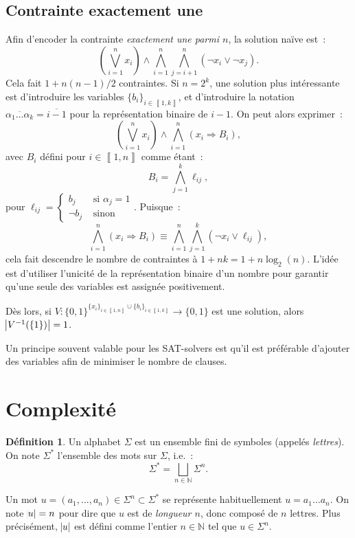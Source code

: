 \documentclass{article}
\theoremstyle{definition}
\newtheorem{déf}[thm]{Définition}
\theoremstyle{remark}
\newcommand{\intint}[2]{\left\llbracket#1, #2\right\rrbracket}
\newcommand{\N}{\mathbb N}
\begin{document}
	\subsection{Contrainte exactement une}
		Afin d'encoder la contrainte \textit{exactement une parmi $n$}, la solution naïve est~:
		\[\left(\bigvee_{i=1}^nx_i\right) \land \bigwedge_{i=1}^n\bigwedge_{j=i+1}^n(\lnot x_i \lor \lnot x_j).\]
		Cela fait $1+n(n-1)/2$ contraintes. Si $n=2^k$, une solution plus intéressante est d'introduire les variables $\{b_i\}_{i \in \intint 1k}$, et d'introduire
		la notation $\overline {\alpha_1\ldots\alpha_k} = \overline {i-1}$ pour la représentation binaire de $i-1$. On peut alors exprimer~:
		\[\left(\bigvee_{i=1}^nx_i\right) \land \bigwedge_{i=1}^n(x_i \Rightarrow B_i),\]
		avec $B_i$ défini pour $i \in \intint 1n$ comme étant~:
		\[B_i = \bigwedge_{j=1}^k\ell_{ij},\]
		pour $\ell_{ij} = \begin{cases}b_j &\text{ si }\alpha_j = 1 \\\lnot b_j&\text{ sinon}\end{cases}$. Puisque~:
		\[\bigwedge_{i=1}^n(x_i \Rightarrow B_i) \equiv \bigwedge_{i=1}^n\bigwedge_{j=1}^k(\lnot x_i \lor \ell_{ij}),\]
		cela fait descendre le nombre de contraintes à $1+nk = 1+n\log_2(n)$. L'idée est d'utiliser l'unicité de la représentation binaire d'un nombre pour garantir
		qu'une seule des variables est assignée positivement.

		Dès lors, si $V : \{0, 1\}^{\{x_i\}_{i \in \intint 1n} \cup \{b_i\}_{i \in \intint 1k}} \to \{0, 1\}$ est une solution, alors $\abs {V^{-1}(\{1\})} = 1$.

		Un principe souvent valable pour les SAT-solvers est qu'il est préférable d'ajouter des variables afin de minimiser le nombre de clauses.

\section{Complexité}
	\begin{déf} Un alphabet $\Sigma$ est un ensemble fini de symboles (appelés \textit{lettres}). On note $\Sigma^*$ l'ensemble des mots sur $\Sigma$, i.e.~:
	\[\Sigma^* = \bigsqcup_{n \in \N}\Sigma^n.\]
	\end{déf}

	Un mot $u = (a_1, \ldots, a_n) \in \Sigma^n \subset \Sigma^*$ se représente habituellement $u = a_1\ldots a_n$. On note $\abs u = n$ pour dire que $u$ est
	de \textit{longueur $n$}, donc composé de $n$ lettres. Plus précisément, $\abs u$ est défini comme l'entier $n \in \N$ tel que $u \in \Sigma^n$.
\end{document}
